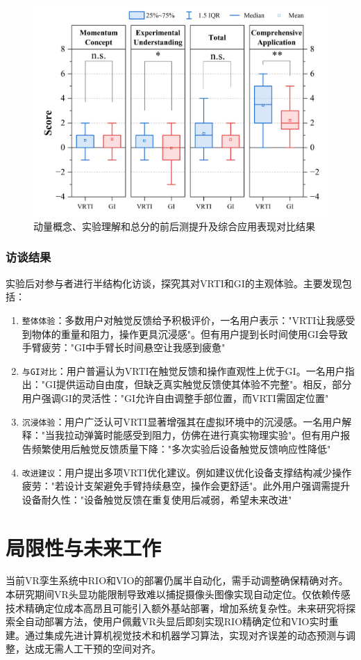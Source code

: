 \documentclass[runningheads]{llncs}
\begin{document}
\begin{figure}
  \centering
  \includegraphics[width=0.8\linewidth]{image/improvements-result.pdf}
  \caption{动量概念、实验理解和总分的前后测提升及综合应用表现对比结果}
  \label{fig:improvements-result}
\end{figure}

\subsubsection{访谈结果}
实验后对参与者进行半结构化访谈，探究其对VRTI和GI的主观体验。主要发现包括：
\begin{enumerate}
  \item {\texttt{整体体验}}：多数用户对触觉反馈给予积极评价，一名用户表示："VRTI让我感受到物体的重量和阻力，操作更具沉浸感"。但有用户提到长时间使用GI会导致手臂疲劳："GI中手臂长时间悬空让我感到疲惫"
  \item {\texttt{与GI对比}}：用户普遍认为VRTI在触觉反馈和操作直观性上优于GI。一名用户指出："GI提供运动自由度，但缺乏真实触觉反馈使其体验不完整"。相反，部分用户强调GI的灵活性："GI允许自由调整手部位置，而VRTI需固定位置"
  \item {\texttt{沉浸体验}}：用户广泛认可VRTI显著增强其在虚拟环境中的沉浸感。一名用户解释："当我拉动弹簧时能感受到阻力，仿佛在进行真实物理实验"。但有用户报告频繁使用后触觉反馈质量下降："多次实验后设备触觉反馈响应性降低"
  \item {\texttt{改进建议}}：用户提出多项VRTI优化建议。例如建议优化设备支撑结构减少操作疲劳："若设计支架避免手臂持续悬空，操作会更舒适"。此外用户强调需提升设备耐久性："设备触觉反馈在重复使用后减弱，希望未来改进"
\end{enumerate}

\section{局限性与未来工作}
当前VR孪生系统中RIO和VIO的部署仍属半自动化，需手动调整确保精确对齐。本研究期间VR头显功能限制导致难以捕捉摄像头图像实现自动定位。仅依赖传感技术精确定位成本高昂且可能引入额外基站部署，增加系统复杂性。未来研究将探索全自动部署方法，使用户佩戴VR头显后即刻实现RIO精确定位和VIO实时重建。通过集成先进计算机视觉技术和机器学习算法，实现对齐误差的动态预测与调整，达成无需人工干预的空间对齐。
\end{document}
